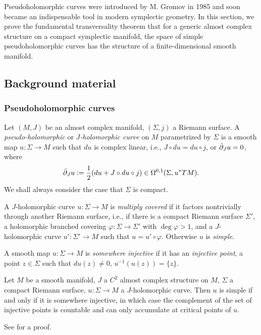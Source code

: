 Pseudoholomorphic curves were introduced by M. Gromov in 1985 
and soon became an indispensable tool in modern symplectic geometry. 
In this section, we prove the fundamental transversality theorem that 
for a generic almost complex structure on a compact symplectic manifold, 
the space of simple pseudoholomorphic curves has the structure 
of a finite-dimensional smooth manifold.

\subsection{Background material}

\subsubsection{Pseudoholomorphic curves}
Let $(M, J)$ be an almost complex manifold, 
$(\Sigma, j)$ a Riemann surface. 
A \textit{pseudo-holomorphic} or \textit{$J$-holomorphic curve} 
on $M$ parametrized by $\Sigma$ is a smooth map 
$u \colon \Sigma \to M$ such that $du$ is complex linear, 
i.e., $J \circ du = du \circ j$, or ${\bar{\partial}}_J u = 0$, where 
\[
	{\bar{\partial}}_J u := \frac{1}{2} (du + J \circ du \circ j) 
		\in \Omega^{0, 1} (\Sigma, u^*TM).
\] 
We shall always consider the case that $\Sigma$ is compact.

A $J$-holomorphic curve $u \colon \Sigma \to M$ is 
\textit{multiply covered} if it factors nontrivially through another 
Riemann surface, i.e., if there is a compact Riemann surface $\Sigma'$, 
a holomorphic branched covering $\varphi \colon \Sigma \to \Sigma'$ 
with $\deg \varphi > 1$, and a $J$-holomorphic curve 
$u' \colon \Sigma' \to M$ such that $u = u' \circ \varphi$. 
Otherwise $u$ is \textit{simple}.

A smooth map $u \colon \Sigma \to M$ is \textit{somewhere injective} 
if it has an \textit{injective point}, a point $z \in \Sigma$ such that 
$du(z) \neq 0$, $u^{-1} (u(z)) = \{z\}$.

\begin{proposition}
	Let $M$ be a smooth manifold, 
	$J$ a $C^2$ almost complex structure on $M$, 
	$\Sigma$ a compact Riemann surface, 
	$u \colon \Sigma \to M$ a $J$-holomorphic curve. 
	Then $u$ is simple if and only if it is somewhere injective, 
	in which case the complement of the set of injective points 
	is countable and can only accumulate at critical points of $u$.
\end{proposition}
See \cite[Proposition~2.5.1]{MS} for a proof.

